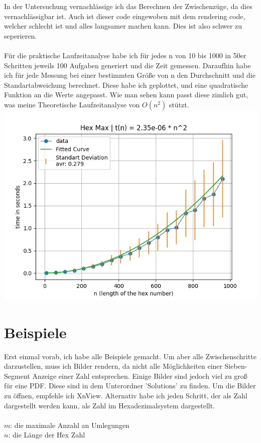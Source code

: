 \documentclass[a4paper,10pt,ngerman]{scrartcl}
\begin{document}
In der Untersuchung vernachlässige ich das Berechnen der Zwischenzüge, da dies vernachlässigbar ist. Auch ist dieser code eingewoben mit dem rendering code, welcher schlecht ist und alles langsamer machen kann. Dies ist also schwer zu seperieren.
\\
\\
Für die praktische Laufzeitanalyse habe ich für jedes n von 10 bis 1000 in 50er Schritten jeweils 100 Aufgaben generiert und die Zeit gemessen. Daraufhin habe ich für jede Messung bei einer bestimmten Größe von n den Durchschnitt und die Standartabweichung berechnet. Diese habe ich geplottet, und eine quadratische Funktion an die Werte angepasst. Wie man sehen kann passt diese zimlich gut, was meine Theoretische Laufzeitanalyse von $O(n^2)$ stützt.
\\
\includegraphics[width=\textwidth]{Laufzeit.png} 

\section{Beispiele}

Erst einmal vorab, ich habe alle Beispiele gemacht. Um aber alle Zwischenschritte darzustellen, muss ich Bilder rendern, da nicht alle Möglichkeiten einer Sieben-Segment Anzeige einer Zahl entsprechen. Einige Bilder sind jedoch viel zu groß für eine PDF. Diese sind in dem Unterordner 'Solutions' zu finden. Um die Bilder zu öffnen, empfehle ich XnView. Alternativ habe ich jeden Schritt, der als Zahl dargestellt werden kann, als Zahl im Hexadezimalsystem dargestellt.
\\
\\
$m$: die maximale Anzahl an Umlegungen
\\
$n$: die Länge der Hex Zahl
\end{document}
